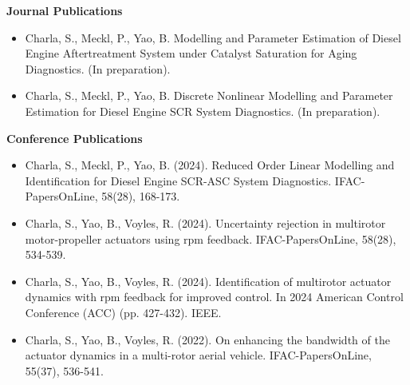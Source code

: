 \index{\verb+\begin{publications}+}

\noindent\textbf{Journal Publications}
\begin{itemize}
        \item[$\lrb{1}$] Charla, S., Meckl, P., Yao, B. Modelling and Parameter Estimation of Diesel Engine
        Aftertreatment System under Catalyst Saturation for Aging Diagnostics. (In preparation).
        \item[$\lrb{2}$] Charla, S., Meckl, P., Yao, B. Discrete Nonlinear Modelling and Parameter Estimation
        for Diesel Engine SCR System Diagnostics. (In preparation).
\end{itemize}

\noindent\textbf{Conference Publications}
\begin{itemize}
        \item[$\lrb{1}$] Charla, S., Meckl, P., Yao, B. (2024). Reduced Order Linear Modelling and Identification for Diesel Engine SCR-ASC System Diagnostics. IFAC-PapersOnLine, 58(28), 168-173.
        \item[$\lrb{2}$] Charla, S., Yao, B., Voyles, R. (2024). Uncertainty rejection in multirotor motor-propeller actuators using rpm feedback. IFAC-PapersOnLine, 58(28), 534-539.
        \item[$\lrb{3}$] Charla, S., Yao, B., Voyles, R. (2024). Identification of multirotor actuator dynamics with rpm feedback for improved control. In 2024 American Control Conference (ACC) (pp. 427-432). IEEE.
        \item[$\lrb{4}$] Charla, S., Yao, B., Voyles, R. (2022). On enhancing the bandwidth of the actuator dynamics in a multi-rotor aerial vehicle. IFAC-PapersOnLine, 55(37), 536-541.
\end{itemize}
